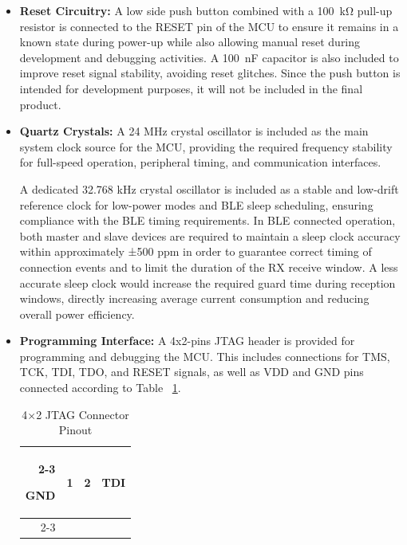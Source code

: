 \begin{itemize}
    \item \textbf{Reset Circuitry:} A low side push button combined with a \SI{100}{\kilo\ohm} pull-up resistor is connected to the RESET pin of the MCU to ensure it remains in a known state during power-up while also allowing manual reset during development and debugging activities. A \SI{100}{\nano\farad} capacitor is also included to improve reset signal stability, avoiding reset glitches. Since the push button is intended for development purposes, it will not be included in the final product.

    \item \textbf{Quartz Crystals:} A 24 MHz crystal oscillator is included as the main system clock source for the MCU, providing the required frequency stability for full-speed operation, peripheral timing, and communication interfaces.
    
    A dedicated 32.768 kHz crystal oscillator is included as a stable and low-drift reference clock for low-power modes and BLE sleep scheduling, ensuring compliance with the BLE timing requirements. In BLE connected operation, both master and slave devices are required to maintain a sleep clock accuracy within approximately ±500 ppm in order to guarantee correct timing of connection events and to limit the duration of the RX receive window. A less accurate sleep clock would increase the required guard time during reception windows, directly increasing average current consumption and reducing overall power efficiency.

    \item \textbf{Programming Interface:} A 4x2-pins JTAG header is provided for programming and debugging the MCU. This includes connections for TMS, TCK, TDI, TDO, and RESET signals, as well as VDD and GND pins connected according to Table ~\ref{tab:jtag_pinout}.
    
            \begin{table}[H]
                \centering
                \caption{4×2 JTAG Connector Pinout}
                \label{tab:jtag_pinout}

                \renewcommand{\arraystretch}{1.3}

                \begin{tabular}{r|c|c|l}
                    \cline{2-3}

                    GND  & 1 & 2 & TDI \\
                    \cline{2-3}


\end{tabular}
\end{table}
\end{itemize}
